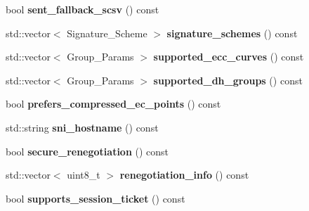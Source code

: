 \begin{DoxyCompactItemize}
bool {\bfseries sent\+\_\+fallback\+\_\+scsv} () const
\item 
\mbox{\label{class_botan_1_1_t_l_s_1_1_client___hello_aac61cc85854433a67ff4e3724fb143c1}} 
std\+::vector$<$ Signature\+\_\+\+Scheme $>$ {\bfseries signature\+\_\+schemes} () const
\item 
\mbox{\label{class_botan_1_1_t_l_s_1_1_client___hello_af0af3c2ada6d5db6e96757f46c0d89aa}} 
std\+::vector$<$ Group\+\_\+\+Params $>$ {\bfseries supported\+\_\+ecc\+\_\+curves} () const
\item 
\mbox{\label{class_botan_1_1_t_l_s_1_1_client___hello_a8066e94d016a4a1c77926d3959848e4c}} 
std\+::vector$<$ Group\+\_\+\+Params $>$ {\bfseries supported\+\_\+dh\+\_\+groups} () const
\item 
\mbox{\label{class_botan_1_1_t_l_s_1_1_client___hello_ad1ec699557386656cfe817ddf1636788}} 
bool {\bfseries prefers\+\_\+compressed\+\_\+ec\+\_\+points} () const
\item 
\mbox{\label{class_botan_1_1_t_l_s_1_1_client___hello_a0a07c56a2c2f343e0225665da3aebcff}} 
std\+::string {\bfseries sni\+\_\+hostname} () const
\item 
\mbox{\label{class_botan_1_1_t_l_s_1_1_client___hello_af6ffc2bb984d6b56bcb4c45f531b914b}} 
bool {\bfseries secure\+\_\+renegotiation} () const
\item 
\mbox{\label{class_botan_1_1_t_l_s_1_1_client___hello_abc3f95daa7d95e87a77f90c42e015238}} 
std\+::vector$<$ uint8\+\_\+t $>$ {\bfseries renegotiation\+\_\+info} () const
\item 
\mbox{\label{class_botan_1_1_t_l_s_1_1_client___hello_a2ae1633751181ce99c295ca4535be241}} 
bool {\bfseries supports\+\_\+session\+\_\+ticket} () const
\item 
\mbox{\label{class_botan_1_1_t_l_s_1_1_client___hello_a66955f40b9ef1115878f7c8843147bea}} 

\end{DoxyCompactItemize}

